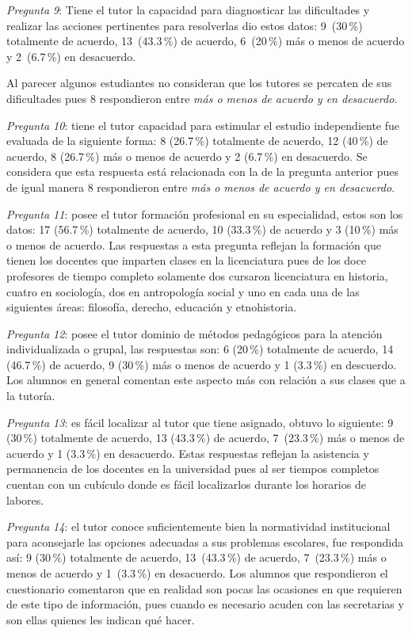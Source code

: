 \textit{Pregunta 9}: Tiene el tutor la capacidad para diagnosticar las
dificultades y realizar las acciones pertinentes para resolverlas dio estos
datos: 9~(30\,\%) totalmente de acuerdo, 13~(43.3\,\%) de acuerdo, 6~(20\,\%) más
o menos de acuerdo y 2~(6.7\,\%) en desacuerdo.


Al parecer algunos estudiantes no consideran que los tutores se percaten de
sus dificultades pues 8 respondieron entre \textit{más o menos de acuerdo y
en desacuerdo}.


\textit{Pregunta 10}: tiene el tutor capacidad para estimular el estudio
independiente fue evaluada de la siguiente forma: 8 (26.7\,\%) totalmente de
acuerdo, 12 (40\,\%) de acuerdo, 8 (26.7\,\%) más o menos de acuerdo y 2
(6.7\,\%) en desacuerdo. Se considera que esta respuesta está relacionada con
la de la pregunta anterior pues de igual manera 8 respondieron entre
\textit{más o menos de acuerdo y en desacuerdo}.


\textit{Pregunta 11}: posee el tutor formación profesional en su
especialidad, estos son los datos: 17 (56.7\,\%) totalmente de acuerdo, 10
(33.3\,\%) de acuerdo y 3 (10\,\%) más o menos de acuerdo. Las respuestas a
esta pregunta reflejan la formación que tienen los docentes que imparten
clases en la licenciatura pues de los doce profesores de tiempo completo
solamente dos cursaron licenciatura en historia, cuatro en sociología, dos
en antropología social y uno en cada una de las siguientes áreas:
filosofía, derecho, educación y etnohistoria.


\textit{Pregunta 12}: posee el tutor dominio de métodos pedagógicos para la
atención individualizada o grupal, las respuestas son: 6 (20\,\%) totalmente
de acuerdo, 14 (46.7\,\%) de acuerdo, 9 (30\,\%) más o menos de acuerdo y 1
(3.3\,\%) en descuerdo. Los alumnos en general comentan este aspecto más con
relación a sus clases que a la tutoría.


\textit{Pregunta 13}: es fácil localizar al tutor que tiene asignado, obtuvo
lo siguiente: 9 (30\,\%) totalmente de acuerdo, 13 (43.3\,\%) de acuerdo, 
7~(23.3\,\%) más o menos de acuerdo y 1 (3.3\,\%) en desacuerdo. Estas respuestas
reflejan la asistencia y permanencia de los docentes en la universidad pues
al ser tiempos completos cuentan con un cubículo donde es fácil
localizarlos durante los horarios de labores.

\begin{sloppypar}
\textit{Pregunta 14}: el tutor conoce suficientemente bien la normatividad
institucional para aconsejarle las opciones adecuadas a sus problemas
escolares, fue respondida así: 9 (30\,\%) totalmente de acuerdo, 13~(43.3\,\%)
de acuerdo, 7~(23.3\,\%) más o menos de acuerdo y 1~(3.3\,\%) en desa\-cuer\-do.
Los alumnos que respondieron el cuestionario comentaron que en realidad son
pocas las ocasiones en que requieren de este tipo de información, pues
cuando es necesario acuden con las secretarias y son ellas quienes les
indican qué hacer.
\end{sloppypar}

